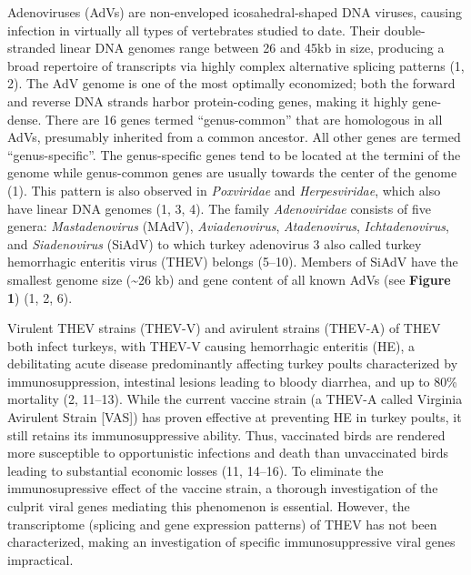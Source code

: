 \documentclass[
]{article}
\begin{document}
Adenoviruses (AdVs) are non-enveloped icosahedral-shaped DNA viruses,
causing infection in virtually all types of vertebrates studied to date.
Their double-stranded linear DNA genomes range between 26 and 45kb in
size, producing a broad repertoire of transcripts via highly complex
alternative splicing patterns (1, 2). The AdV genome is one of the most
optimally economized; both the forward and reverse DNA strands harbor
protein-coding genes, making it highly gene-dense. There are 16 genes
termed ``genus-common'' that are homologous in all AdVs, presumably
inherited from a common ancestor. All other genes are termed
``genus-specific''. The genus-specific genes tend to be located at the
termini of the genome while genus-common genes are usually towards the
center of the genome (1). This pattern is also observed in
\emph{Poxviridae} and \emph{Herpesviridae}, which also have linear DNA
genomes (1, 3, 4). The family \emph{Adenoviridae} consists of five
genera: \emph{Mastadenovirus} (MAdV), \emph{Aviadenovirus},
\emph{Atadenovirus}, \emph{Ichtadenovirus}, and \emph{Siadenovirus}
(SiAdV) to which turkey adenovirus 3 also called turkey hemorrhagic
enteritis virus (THEV) belongs (5--10). Members of SiAdV have the
smallest genome size (\textasciitilde26 kb) and gene content of all
known AdVs (see \textbf{Figure 1}) (1, 2, 6).

Virulent THEV strains (THEV-V) and avirulent strains (THEV-A) of THEV
both infect turkeys, with THEV-V causing hemorrhagic enteritis (HE), a
debilitating acute disease predominantly affecting turkey poults
characterized by immunosuppression, intestinal lesions leading to bloody
diarrhea, and up to 80\% mortality (2, 11--13). While the current
vaccine strain (a THEV-A called Virginia Avirulent Strain {[}VAS{]}) has
proven effective at preventing HE in turkey poults, it still retains its
immunosuppressive ability. Thus, vaccinated birds are rendered more
susceptible to opportunistic infections and death than unvaccinated
birds leading to substantial economic losses (11, 14--16). To eliminate
the immunosupressive effect of the vaccine strain, a thorough
investigation of the culprit viral genes mediating this phenomenon is
essential. However, the transcriptome (splicing and gene expression
patterns) of THEV has not been characterized, making an investigation of
specific immunosuppressive viral genes impractical.
\end{document}

